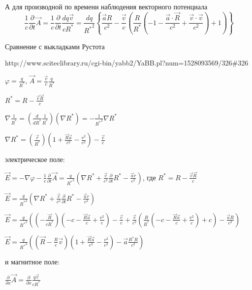 \documentclass[11pt]{article}
\begin{document}
А для производной по времени наблюдения векторного потенциала
\[\frac{1}{c}\frac{\partial }{\partial t}\overrightarrow{A}=\frac{1}{c}\frac{\partial }{\partial t}\frac{dq\overrightarrow{v}}{c{{R}^{*}}}=\frac{dq}{{{R}^{*}}^{2}}\left\{ \frac{\overrightarrow{a}R}{{{c}^{2}}}-\frac{\overrightarrow{v}}{c}\left( \frac{R}{{{R}^{*}}}\left( -1-\frac{\overrightarrow{a}\cdot \overrightarrow{R}}{{{c}^{2}}}+\frac{\overrightarrow{v}\cdot \overrightarrow{v}}{{{c}^{2}}} \right)+1 \right) \right\}\]

    Сравнение с выкладками Рустота

http://www.sciteclibrary.ru/cgi-bin/yabb2/YaBB.pl?num=1528093569/326\#326

\(\varphi=\frac{q}{{R}^{*}}\),
\(\vec{A}=\frac{\vec{v}}{c}\frac{q}{{R}^{*}}\)

\({R}^{*} = R - \frac{\vec{v}\vec{R}}{c}\)

\(\nabla\frac{1}{{{R}^{*}}} = \left(\frac{d}{d{{R}^{*}}}\frac{1}{{{R}^{*}}}\right)\left(\nabla {{R}^{*}}\right) = -\frac{1}{{{R}^{*}}^2}\nabla {{R}^{*}}\)

\(\nabla {{R}^{*}} = \left(\frac{\vec{r}}{{{R}^{*}}}\right)\left(1 + \frac{\vec{R}\vec{a}}{c^2}-\frac{v^2}{c^2}\right)-\frac{\vec{v}}{c}\)

электрическое поле:

\(\vec{E} = -\nabla\varphi - \frac{1}{c}\frac{\partial}{\partial t}\vec{A} = \frac{q}{{{R}^{*}}^2}\left(\nabla {{R}^{*}}+\frac{\vec{v}}{c^2}\frac{\partial}{\partial t}{{R}^{*}} - \frac{\vec{a}r}{c^2}\right)\),
где \({{R}^{*}} = R - \frac{\vec{v}\vec{R}}{c}\)

\(\vec{E} = \frac{q}{{{R}^{*}}^2}\left(\nabla {{R}^{*}}+\frac{\vec{v}}{c^2}\frac{\partial}{\partial t}{{R}^{*}} - \frac{\vec{a}r}{c^2}\right)\)

\(\vec{E} = \frac{q}{{{R}^{*}}^2}\left(\left(-\frac{\vec{R}}{c {{R}^{*}}}\right)\left(-c - \frac{\vec{R}\vec{a}}{c} + \frac{v^2}{c}\right)-\frac{\vec{v}}{c}+\frac{\vec{v}}{c^2}\left(\frac{R}{{{R}^{*}}}\left(-c - \frac{\vec{R}\vec{a}}{c} + \frac{v^2}{c}\right) + c\right) - \frac{\vec{a}R}{c^2}\right)\)

\(\vec{E} = \frac{q}{{{R}^{*}}^3}\left(\left(\vec{R}-\frac{R}{c}\vec{v}\right)\left(1 + \frac{\vec{R}\vec{a}}{c^2} - \frac{v^2}{c^2}\right) - \vec{a}\frac{{{R}^{*}}R}{c^2}\right)\)

и магнитное поле:

\(\frac{\partial}{\partial x}\vec{A} = \frac{\partial}{\partial x}\frac{q\vec{v}}{c{{R}^{*}} }\)
\end{document}
